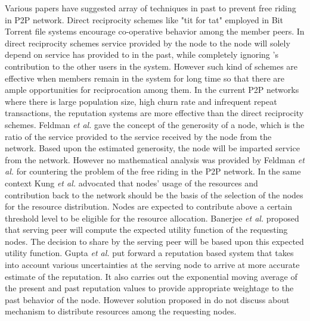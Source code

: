 \documentclass[journal]{IEEEtran}
\begin{document}
Various papers have suggested array of techniques in past to prevent free riding in P2P network. Direct reciprocity schemes like "tit for tat" \cite{tit_for_tat} employed in Bit Torrent file systems \cite{Cohen} encourage co-operative behavior among the member peers. In direct reciprocity schemes service provided by the node  to the node  will solely depend on service  has provided to  in the past, while completely ignoring 's contribution to the other users in the system. However such kind of schemes  are effective when members remain in the system for long time so that there are ample opportunities for reciprocation among them. In the current P2P networks where there is large population size, high churn rate \cite{Stutzbach} and infrequent repeat transactions, the reputation systems are more effective than the direct reciprocity schemes. Feldman \emph{et al.} \cite{Feldman} gave the concept of the generosity of a node, which is the ratio of the service provided to the service received by the node from the network. Based upon the estimated generosity, the node will be imparted service from the network. However no mathematical analysis was provided by Feldman \emph{et al.} for countering the problem of the free riding in the P2P network. In the same context Kung \emph{et al.} \cite{Kung} advocated that nodes' usage of the resources and contribution back to the network should be the basis of the selection of the nodes for the resource distribution. Nodes are expected to contribute above a certain threshold level to be eligible for the resource allocation. Banerjee \emph{et al.} \cite{Banerjee} proposed that serving peer will compute the expected utility function of the requesting nodes. The decision to share by the serving peer will be based upon this expected utility function. Gupta \emph{et al.} \cite{TrustEstimation} put forward a reputation based system that takes into account various uncertainties at the serving node to arrive at more accurate estimate of the reputation. It also carries out the exponential moving average of the present and past reputation values to provide appropriate weightage to the past behavior of the node. However solution proposed in \cite{Feldman}\cite{Kung}\cite{Banerjee}\cite{TrustEstimation} do not discuss about mechanism to distribute resources among the requesting nodes. 
\end{document}
